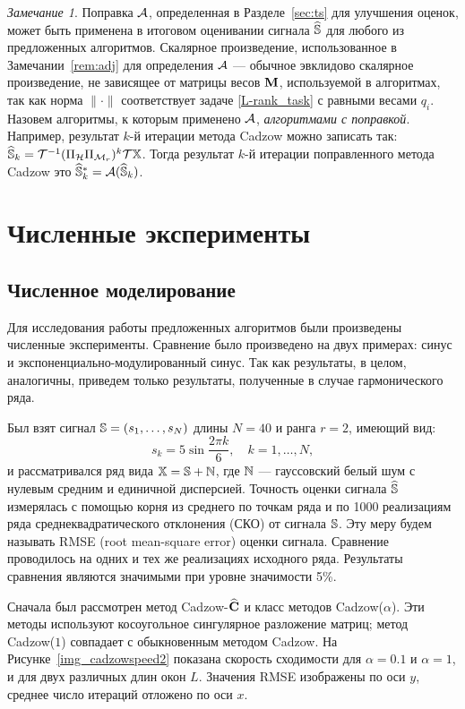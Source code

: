 \documentclass[12pt, specialist, subf,href,colorlinks=true,substylefile = spbu.rtx]{disser}
\theoremstyle{remark}
\newtheorem{remark}{Замечание}
\theoremstyle{definition}
\begin{document}
	\begin{remark}
		\label{rem:adjust}
		 Поправка $\mathcal{A}$, определенная в Разделе~\ref{sec:ts} для улучшения оценок, может быть применена в итоговом оценивании сигнала $\widehat{\mathbb{S}}$ для любого из предложенных алгоритмов. Скалярное произведение, использованное в Замечании~\ref{rem:adj} для определения $\mathcal{A}$ --- обычное эвклидово скалярное произведение, не зависящее от матрицы весов $\mathbf{M}$, используемой в алгоритмах, так как норма $\|\cdot\|$ соответствует задаче \eqref{L-rank_task} с равными весами $q_i$. Назовем алгоритмы, к которым применено $\mathcal{A}$, \emph{алгоритмами с поправкой}. Например, результат $k$-й итерации метода Cadzow можно записать так: $\widehat{\mathbb{S}}_k = \mathcal{T}^{-1}(\Pi_{\mathcal{H}} \Pi_{\mathcal{M}_r})^k \mathcal{T} \mathbb{X}$. Тогда результат $k$-й итерации поправленного метода Cadzow это $\widehat{\mathbb{S}}_k^*=\mathcal{A}(\widehat{\mathbb{S}}_k)$.
	\end{remark}

\chapter{Численные эксперименты}
\section{Численное моделирование}
\label{sec:simul}
Для исследования работы предложенных алгоритмов были произведены численные эксперименты. Сравнение было произведено на двух примерах: синус и экспоненциально-модулированный синус. Так как результаты, в целом, аналогичны, приведем только результаты, полученные в случае гармонического ряда.

Был взят сигнал $\mathbb{S} = (s_{1}, \ldots, s_N)$ длины $N = 40$ и ранга $r=2$, имеющий вид:
\begin{equation}
\label{eq:signal}
s_{k} = 5\sin{\frac{2 \pi k}{6}}, \quad k = 1, \ldots, N,
\end{equation}
и рассматривался ряд вида $\mathbb{X} = \mathbb{S} + \mathbb{N}$, где $\mathbb{N}$ --- гауссовский белый шум с нулевым средним и единичной дисперсией. Точность оценки сигнала $\widehat{\mathbb{S}}$ измерялась с помощью корня из среднего по точкам ряда и по 1000 реализациям ряда среднеквадратического отклонения (СКО) от сигнала $\mathbb{S}$. Эту меру будем называть RMSE (root mean-square error) оценки сигнала. Сравнение проводилось на одних и тех же реализациях исходного ряда. Результаты сравнения являются значимыми при уровне значимости 5\%.

Сначала был рассмотрен метод Cadzow-$\widehat{\mathbf{C}}$ и класс методов Cadzow($\alpha$). Эти методы используют косоугольное сингулярное разложение матриц; метод Cadzow($1$) совпадает с обыкновенным методом Cadzow. На Рисунке~\ref{img_cadzowspeed2} показана скорость сходимости для $\alpha = 0.1$ и $\alpha = 1$, и для двух различных длин окон $L$. Значения RMSE изображены по оси $y$, среднее число итераций отложено по оси $x$.
\end{document}
